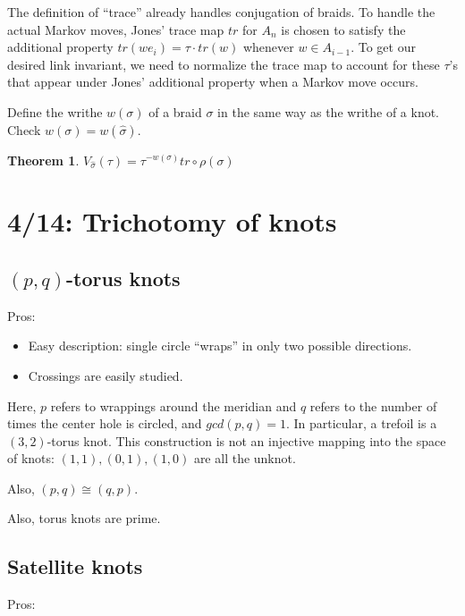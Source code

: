 \documentclass[11pt]{article}
\theoremstyle{plain}
\newtheorem{thm}{Theorem}
\theoremstyle{definition}
\begin{document}
\bigskip
The definition of ``trace'' already handles conjugation of braids. To handle the actual Markov moves, Jones' trace map $tr$ for $A_n$ is chosen to satisfy the additional property $tr(we_i)=\tau\cdot tr(w)$ whenever $w\in A_{i-1}$. To get our desired link invariant, we need to normalize the trace map to account for these $\tau$'s that appear under Jones' additional property when a Markov move occurs.

\bigskip
Define the writhe $w(\sigma)$ of a braid $\sigma$ in the same way as the writhe of a knot. Check $w(\sigma)=w(\hat\sigma)$.

\begin{thm}
$V_{\widehat\sigma}(\tau)=\tau^{-w(\sigma)}tr\circ\rho(\sigma)$
\end{thm}










\clearpage
\section{4/14: Trichotomy of knots}


\subsection{$(p,q)$-torus knots}

Pros:

\begin{itemize}
  \item Easy description: single circle ``wraps'' in only two possible directions.
  \item Crossings are easily studied.
\end{itemize}

Here, $p$ refers to wrappings around the meridian and $q$ refers to the number of times the center hole is circled, and $gcd(p,q)=1$. In particular, a trefoil is a $(3,2)$-torus knot.
This construction is not an injective mapping into the space of knots: $(1,1), (0,1), (1, 0)$ are all the unknot.

Also, $(p,q) \cong (q, p)$.

Also, torus knots are prime.

\subsection{Satellite knots}

Pros:
\end{document}

